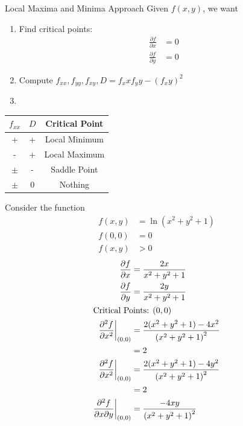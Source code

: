 \documentclass[8pt]{extarticle}
\begin{document}
  \begin{problem}{Local Maxima and Minima Approach}
    Given $f(x,y)$, we want
    \begin{enumerate}[(1)]
      \item Find critical points:
        \begin{align*}
          \frac{\partial f}{\partial x} &= 0\\
          \frac{\partial f}{\partial y} &= 0
        \end{align*}
      \item Compute $f_{xx},f_{yy},f_{xy}, D = f_xxf_yy-(f_xy)^2$
      \item \hfill
    \end{enumerate}
    \begin{center}
      \begin{tabular}{c|c|c}
        $f_{xx}$ & $D$ & Critical Point\\
        \hline
        + & + & Local Minimum \\
        - & + & Local Maximum\\
        $\pm$ & - & Saddle Point \\
        $\pm$ & 0 & Nothing
      \end{tabular}
    \end{center}
    Consider the function
    \begin{align*}
      f(x,y) &= \ln(x^2 + y^2 + 1)\\
      f(0,0) &= 0\\
      f(x,y) &> 0
    \end{align*}
    \begin{align*}
      \frac{\partial f}{\partial x} &= \frac{2x}{x^2 + y^2 + 1}\\
      \frac{\partial f}{\partial y} &= \frac{2y}{x^2 + y^2 + 1}\\
      \shortintertext{Critical Points: $(0,0)$}
      \frac{\partial^2 f}{\partial x^2}\biggr\vert_{(0,0)} &= \frac{2(x^2 + y^2 + 1)-4x^2}{\left(x^2 + y^2 + 1\right)^2}\\
                                                           &= 2\\
      \frac{\partial^2f}{\partial x^2}\biggr\vert_{(0,0)}&= \frac{2(x^2 + y^2 + 1) - 4y^2}{\left(x^2 + y^2 + 1\right)^2}\\
                                      &= 2\\
    \frac{\partial^2f}{\partial x \partial y}\biggr\vert_{(0,0)} &= \frac{-4xy}{\left(x^2 + y^2 + 1\right)^2}\\

\end{align*}
\end{problem}
\end{document}
